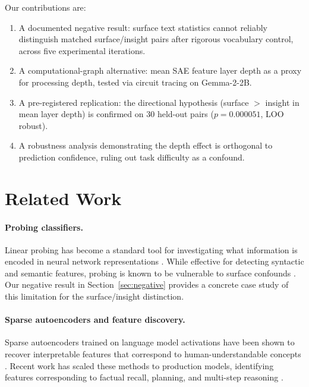 \documentclass[10pt]{article}
\begin{document}
Our contributions are:
\begin{enumerate}
    \item A documented negative result: surface text statistics cannot reliably distinguish matched surface/insight pairs after rigorous vocabulary control, across five experimental iterations.
    \item A computational-graph alternative: mean SAE feature layer depth as a proxy for processing depth, tested via circuit tracing on Gemma-2-2B.
    \item A pre-registered replication: the directional hypothesis (surface $>$ insight in mean layer depth) is confirmed on 30 held-out pairs ($p{=}0.000051$, LOO robust).
    \item A robustness analysis demonstrating the depth effect is orthogonal to prediction confidence, ruling out task difficulty as a confound.
\end{enumerate}

\section{Related Work}

\paragraph{Probing classifiers.}
Linear probing has become a standard tool for investigating what information is encoded in neural network representations \citep{belinkov2022probing, hewitt2019structural}. While effective for detecting syntactic and semantic features, probing is known to be vulnerable to surface confounds \citep{hewitt2019designing}. Our negative result in Section~\ref{sec:negative} provides a concrete case study of this limitation for the surface/insight distinction.

\paragraph{Sparse autoencoders and feature discovery.}
Sparse autoencoders trained on language model activations have been shown to recover interpretable features that correspond to human-understandable concepts \citep{cunningham2023sparse, bricken2023monosemanticity}. Recent work has scaled these methods to production models, identifying features corresponding to factual recall, planning, and multi-step reasoning \citep{anthropic2025biology}.
\end{document}

